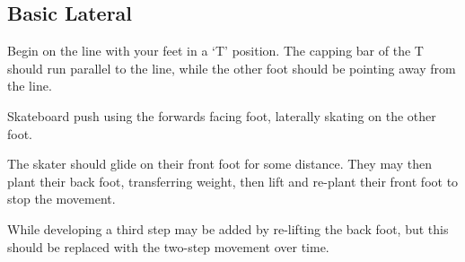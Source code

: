 \subsection*{Basic Lateral}
\label{technique:laterals/developmental/basic}

Begin on the line with your feet in a `T' position. The capping bar of the T should run parallel to the line, while the other foot should be pointing away from the line.     

Skateboard push using the forwards facing foot, laterally skating on the other foot.   

The skater should glide on their front foot for some distance.
They may then plant their back foot, transferring weight, then lift and re-plant their front foot to stop the movement. 

While developing a third step may be added by re-lifting the back foot, but this should be replaced with the two-step movement over time.
